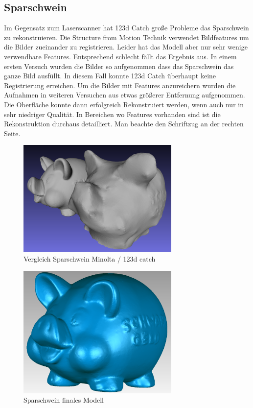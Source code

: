 \documentclass[]{article}
\begin{document}
\subsection{Sparschwein}
Im Gegensatz zum Laserscanner hat 123d Catch große Probleme das Sparschwein zu rekonstruieren. Die Structure from Motion Technik verwendet Bildfeatures um die Bilder zueinander zu registrieren. Leider hat das Modell aber nur sehr wenige verwendbare Features. Entsprechend schlecht fällt das Ergebnis aus. In einem ersten Versuch wurden die Bilder so aufgenommen dass das Sparschwein das ganze Bild ausfüllt. In diesem Fall konnte 123d Catch überhaupt keine Registrierung erreichen. Um die Bilder mit Features anzureichern wurden die Aufnahmen in weiteren Versuchen aus etwas größerer Entfernung aufgenommen. Die Oberfläche konnte dann erfolgreich Rekonstruiert werden, wenn auch nur in sehr niedriger Qualität. In Bereichen wo Features vorhanden sind ist die Rekonstruktion durchaus detailliert. Man beachte den Schriftzug an der rechten Seite.

\begin{figure}[p]
\caption{Vergleich Sparschwein Minolta / 123d catch}
\centering
\includegraphics[width=80mm]{images/sparschwein/123d_Vergleich} %
\end{figure}

\begin{figure}[p]
\centering
\caption{Sparschwein finales Modell}
\includegraphics[width=80mm]{images/sparschwein/final} %
\end{figure}
		
\end{document}
